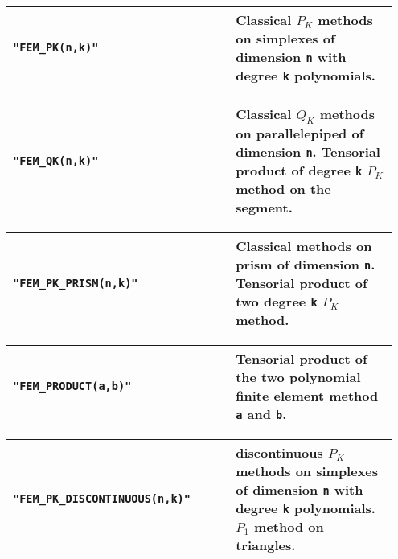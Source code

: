 \begin{center} \begin{tabular}{|m{0.55\linewidth}|m{0.4\linewidth}|} \hline
{\tt "FEM\_PK(n,k)"} & Classical $P_K$ methods on simplexes of dimension  {\tt n} with degree {\tt k} polynomials.\\ \hline
\end{tabular}  
\begin{tabular}{|m{0.55\linewidth}|m{0.4\linewidth}|} \hline
{\tt "FEM\_QK(n,k)"} & Classical $Q_K$ methods on parallelepiped of dimension {\tt n}. Tensorial product of degree {\tt k} $P_K$ method on the segment. \\ \hline
\end{tabular}  
\begin{tabular}{|m{0.55\linewidth}|m{0.4\linewidth}|} \hline
{\tt "FEM\_PK\_PRISM(n,k)"} & Classical methods on prism of dimension {\tt n}. Tensorial product of two degree {\tt k} $P_K$ method. \\ \hline
\end{tabular}  
\begin{tabular}{|m{0.55\linewidth}|m{0.4\linewidth}|} \hline
{\tt "FEM\_PRODUCT(a,b)"} & Tensorial product of the two polynomial finite element method {\tt a} and {\tt b}. \\ \hline
\end{tabular}   
\begin{tabular}{|m{0.55\linewidth}|m{0.4\linewidth}|} \hline
{\tt "FEM\_PK\_DISCONTINUOUS(n,k)"} & discontinuous $P_K$ methods on simplexes of dimension  {\tt n} with degree {\tt k} polynomials. $P_1$ method on triangles. \\ \hline
\end{tabular}  
\end{center}
